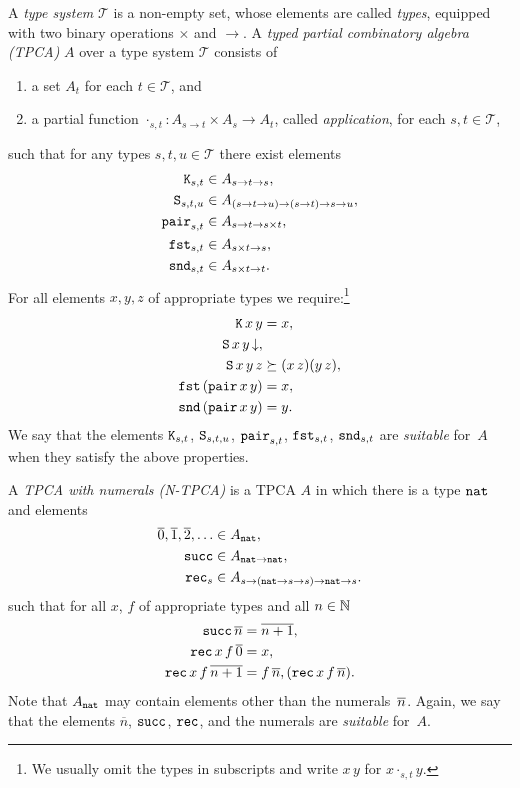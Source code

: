 A \emph{type system} $\mathcal{T}$ is a non-empty set, whose elements
are called \emph{types}, equipped with two binary operations $\times$
and $\to$. A \emph{typed partial combinatory algebra (TPCA)} $A$ over
a type system $\mathcal{T}$ consists of
%
\begin{enumerate}
\item a set $A_t$ for each $t \in \mathcal{T}$, and
\item a partial function $\cdot_{s,t} : A_{s \to t} \times A_s \to
  A_t$, called \emph{application}, for each $s, t \in \mathcal{T}$,
\end{enumerate}
%
such that for any types $s, t, u \in \mathcal{T}$ there exist elements
%
\begin{align*}
  \mathtt{K}_{s,t} &\in A_{s \to t \to s}, \\
  \mathtt{S}_{s,t,u} &\in A_{(s \to t \to u) \to (s \to t) \to s \to u}, \\
  \mathtt{pair}_{s,t} &\in A_{s \to t \to s \times t}, \\
  \mathtt{fst}_{s,t} &\in A_{s \times t \to s}, \\
  \mathtt{snd}_{s,t} &\in A_{s \times t \to t}.
\end{align*}
%
For all elements $x, y, z$ of appropriate types we require:\footnote{We
  usually omit the types in subscripts and write $x \, y$ for $x
  \cdot_{s,t} y$.}
%
\begin{align*}
  \mathtt{K} \, x \, y &= x, \\
  \mathtt{S} \, x \, y\,{\downarrow}, & \\
  \mathtt{S} \, x \, y \, z &\succeq  (x \, z) (y \, z), \\
  \mathtt{fst} \, (\mathtt{pair} \, x \, y) &= x, \\
  \mathtt{snd} \, (\mathtt{pair} \, x \, y) &= y.
\end{align*}
%
We say that the elements $\mathtt{K}_{s,t}$, $\mathtt{S}_{s,t,u}$,
$\mathtt{pair}_{s,t}$, $\mathtt{fst}_{s,t}$, $\mathtt{snd}_{s,t}$ are
\emph{suitable} for~$A$ when they satisfy the above properties.

A \emph{TPCA with numerals (N-TPCA)} is a TPCA $A$ in which there is a
type $\mathtt{nat}$ and elements
%
\begin{align*}
  \overline{0}, \overline{1}, \overline{2}, \ldots &\in A_{\mathtt{nat}}, \\
  \mathtt{succ} &\in A_{\mathtt{nat} \to \mathtt{nat}}, \\
  \mathtt{rec}_s &\in A_{s \to (\mathtt{nat} \to s \to s) \to \mathtt{nat} \to s}.
\end{align*}
%
such that for all $x$, $f$ of appropriate types and all $n \in \mathbb{N}$
%
\begin{align*}
  \mathtt{succ} \, \overline{n} &= \overline{n + 1}, \\
  \mathtt{rec} \, x \, f \, \overline{0} &= x, \\
  \mathtt{rec} \, x \, f \, \overline{n+1} &= f \, \overline{n},
     (\mathtt{rec} \, x \, f \, \overline{n}).
\end{align*}
%
Note that $A_{\mathtt{nat}}$ may contain elements other than the
numerals~$\overline{n}$. Again, we say that the elements
$\overline{n}$, $\mathtt{succ}$, $\mathtt{rec}$, and the numerals are
\emph{suitable} for~$A$.

